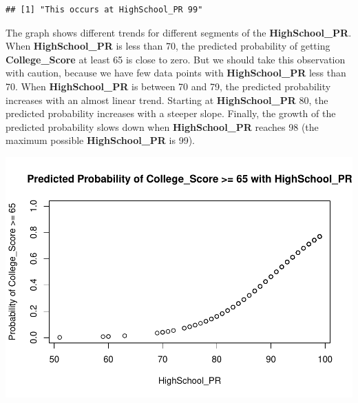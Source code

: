 \documentclass[
]{article}
\newenvironment{Shaded}{\begin{snugshade}}{\end{snugshade}}
\newcommand{\AttributeTok}[1]{\textcolor[rgb]{0.77,0.63,0.00}{#1}}
\newcommand{\CommentTok}[1]{\textcolor[rgb]{0.56,0.35,0.01}{\textit{#1}}}
\newcommand{\DecValTok}[1]{\textcolor[rgb]{0.00,0.00,0.81}{#1}}
\newcommand{\FunctionTok}[1]{\textcolor[rgb]{0.00,0.00,0.00}{#1}}
\newcommand{\NormalTok}[1]{#1}
\newcommand{\OtherTok}[1]{\textcolor[rgb]{0.56,0.35,0.01}{#1}}
\newcommand{\SpecialCharTok}[1]{\textcolor[rgb]{0.00,0.00,0.00}{#1}}
\newcommand{\StringTok}[1]{\textcolor[rgb]{0.31,0.60,0.02}{#1}}
\begin{document}
\begin{verbatim}
## [1] "This occurs at HighSchool_PR 99"
\end{verbatim}

The graph shows different trends for different segments of the
\textbf{HighSchool\_PR}. When \textbf{HighSchool\_PR} is less than 70,
the predicted probability of getting \textbf{College\_Score} at least 65
is close to zero. But we should take this observation with caution,
because we have few data points with \textbf{HighSchool\_PR} less than
70. When \textbf{HighSchool\_PR} is between 70 and 79, the predicted
probability increases with an almost linear trend. Starting at
\textbf{HighSchool\_PR} 80, the predicted probability increases with a
steeper slope. Finally, the growth of the predicted probability slows
down when \textbf{HighSchool\_PR} reaches 98 (the maximum possible
\textbf{HighSchool\_PR} is 99).

\begin{Shaded}
\end{Shaded}

\includegraphics{PTT_Analysis_of_Test_Scores_Unfinished_files/figure-latex/validation-draft-1.pdf}
\end{document}
